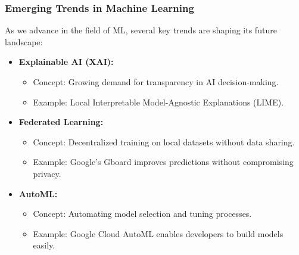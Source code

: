 \documentclass[aspectratio=169]{beamer}
\begin{document}
\begin{frame}[fragile]
    \frametitle{Emerging Trends in Machine Learning}
    As we advance in the field of ML, several key trends are shaping its future landscape:
    \begin{itemize}
        \item \textbf{Explainable AI (XAI):} 
        \begin{itemize}
            \item Concept: Growing demand for transparency in AI decision-making.
            \item Example: Local Interpretable Model-Agnostic Explanations (LIME).
        \end{itemize}
        
        \item \textbf{Federated Learning:}
        \begin{itemize}
            \item Concept: Decentralized training on local datasets without data sharing.
            \item Example: Google's Gboard improves predictions without compromising privacy.
        \end{itemize}

        \item \textbf{AutoML:}
        \begin{itemize}
            \item Concept: Automating model selection and tuning processes.
            \item Example: Google Cloud AutoML enables developers to build models easily.
        \end{itemize}
    \end{itemize}
\end{frame}
\end{document}
